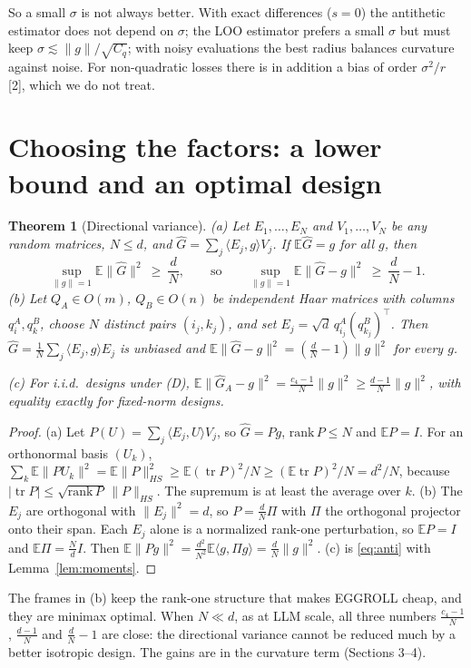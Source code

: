 \documentclass[11pt]{article}
\newtheorem{theorem}{Theorem}
\theoremstyle{remark}
\newcommand{\E}{\mathbb{E}}
\newcommand{\ip}[2]{\langle #1,#2\rangle}
\DeclareMathOperator{\tr}{tr}
\newcommand{\Gh}{\widehat G}
\begin{document}
So a small $\sigma$ is not always better. With exact differences ($s=0$) the antithetic estimator does not depend on $\sigma$; the LOO estimator prefers a small $\sigma$ but must keep $\sigma\lesssim\|g\|/\sqrt{C_q}$; with noisy evaluations the best radius balances curvature against noise. For non-quadratic losses there is in addition a bias of order $\sigma^2/r$ [2], which we do not treat.

\section{Choosing the factors: a lower bound and an optimal design}
\begin{theorem}[Directional variance]\label{thm:lower}
(a) Let $E_1,\dots,E_N$ and $V_1,\dots,V_N$ be any random matrices, $N\le d$, and $\Gh=\sum_j\ip{E_j}{g}V_j$. If $\E\Gh=g$ for all $g$, then
\[
\sup_{\|g\|=1}\E\|\Gh\|^2\ \ge\ \frac dN,\qquad\text{so}\qquad \sup_{\|g\|=1}\E\|\Gh-g\|^2\ \ge\ \frac dN-1 .
\]
(b) Let $Q_A\in O(m)$, $Q_B\in O(n)$ be independent Haar matrices with columns $q^A_i,q^B_k$, choose $N$ distinct pairs $(i_j,k_j)$, and set $E_j=\sqrt d\,q^A_{i_j}(q^B_{k_j})^\top$. Then $\Gh=\frac1N\sum_j\ip{E_j}{g}E_j$ is unbiased and $\E\|\Gh-g\|^2=(\frac dN-1)\|g\|^2$ for every $g$.

(c) For i.i.d.\ designs under (D), $\E\|\Gh_A-g\|^2=\frac{c_4-1}{N}\|g\|^2\ge\frac{d-1}{N}\|g\|^2$, with equality exactly for fixed-norm designs.
\end{theorem}
\begin{proof}
(a) Let $P(U)=\sum_j\ip{E_j}{U}V_j$, so $\Gh=Pg$, $\mathrm{rank}\,P\le N$ and $\E P=I$. For an orthonormal basis $(U_k)$, $\sum_k\E\|PU_k\|^2=\E\|P\|_{HS}^2\ge\E(\tr P)^2/N\ge(\E\tr P)^2/N=d^2/N$, because $|\tr P|\le\sqrt{\mathrm{rank}\,P}\,\|P\|_{HS}$. The supremum is at least the average over $k$. (b) The $E_j$ are orthogonal with $\|E_j\|^2=d$, so $P=\frac dN\Pi$ with $\Pi$ the orthogonal projector onto their span. Each $E_j$ alone is a normalized rank-one perturbation, so $\E P=I$ and $\E\Pi=\frac NdI$. Then $\E\|Pg\|^2=\frac{d^2}{N^2}\E\ip{g}{\Pi g}=\frac dN\|g\|^2$. (c) is \eqref{eq:anti} with Lemma~\ref{lem:moments}.
\end{proof}
The frames in (b) keep the rank-one structure that makes EGGROLL cheap, and they are minimax optimal. When $N\ll d$, as at LLM scale, all three numbers $\frac{c_4-1}N$, $\frac{d-1}N$ and $\frac dN-1$ are close: the directional variance cannot be reduced much by a better isotropic design. The gains are in the curvature term (Sections 3--4).
\end{document}
